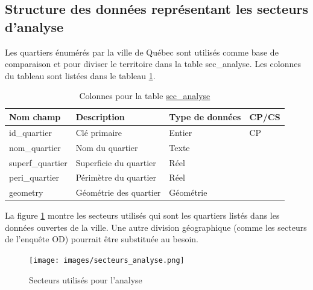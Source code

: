     \subsection{Structure des données représentant les secteurs d'analyse}\label{ssec:struct_donnees_sec_analyse}
        Les quartiers énumérés par la ville de Québec sont utilisés comme base de comparaison et pour diviser le territoire dans la table sec\_analyse. Les colonnes du tableau sont listées dans le tableau \ref{tab:definition_sec_analyse}.
        \begin{table}[h]
           \centering
           \begin{tabular}{m{}|m{}m{}m{}}
                \hline
                Nom champ & Description & Type de données & CP/CS  \\
                \hline
                id\_quartier & Clé primaire & Entier & CP \\
                nom\_quartier & Nom du quartier & Texte & \\
                superf\_quartier & Superficie du quartier & Réel & \\
                peri\_quartier & Périmètre du quartier & Réel & \\
                geometry & Géométrie des quartier & Géométrie & \\
                \hline
           \end{tabular}
           \caption{Colonnes pour la table \underline{sec\_analyse}}
           \label{tab:definition_sec_analyse}
        \end{table}   
        La figure \ref{fig:sec-analyse} montre les secteurs utilisés qui sont les quartiers listés dans les données ouvertes de la ville. Une autre division géographique (comme les secteurs de l'enquête OD) pourrait être substituée au besoin.
        \begin{figure}[h]
            \centering
            \texttt{[image: images/secteurs\_analyse.png]}
            \caption{Secteurs utilisés pour l'analyse}
            \label{fig:sec-analyse}
        \end{figure}
        \FloatBarrier
    
